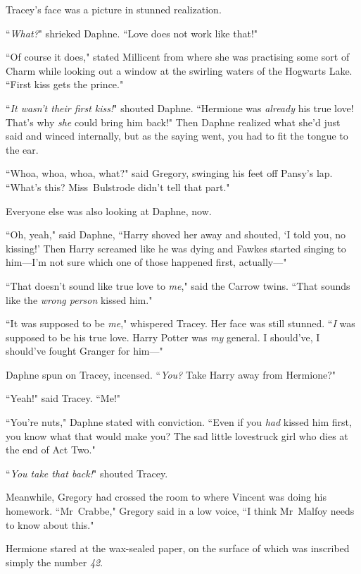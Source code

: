 Tracey's face was a picture in stunned realization.

``\emph{What?}" shrieked Daphne. ``Love does not work like that!"

``Of course it does," stated Millicent from where she was practising some sort of Charm while looking out a window at the swirling waters of the Hogwarts Lake. ``First kiss gets the prince."

``\emph{It wasn't their first kiss!}" shouted Daphne. ``Hermione was \emph{already} his true love! That's why \emph{she} could bring him back!" Then Daphne realized what she'd just said and winced internally, but as the saying went, you had to fit the tongue to the ear.

``Whoa, whoa, whoa, what?" said Gregory, swinging his feet off Pansy's lap. ``What's this? Miss~Bulstrode didn't tell that part."

Everyone else was also looking at Daphne, now.

``Oh, yeah," said Daphne, ``Harry shoved her away and shouted, `I told you, no kissing!' Then Harry screamed like he was dying and Fawkes started singing to him—I'm not sure which one of those happened first, actually—"

``That doesn't sound like true love to \emph{me}," said the Carrow twins. ``That sounds like the \emph{wrong person} kissed him."

``It was supposed to be \emph{me}," whispered Tracey. Her face was still stunned. ``\emph{I} was supposed to be his true love. Harry Potter was \emph{my} general. I should've, I should've fought Granger for him—"

Daphne spun on Tracey, incensed. ``\emph{You?} Take Harry away from Hermione?"

``Yeah!" said Tracey. ``Me!"

``You're nuts," Daphne stated with conviction. ``Even if you \emph{had} kissed him first, you know what that would make you? The sad little lovestruck girl who dies at the end of Act Two."

``\emph{You take that back!}" shouted Tracey.

Meanwhile, Gregory had crossed the room to where Vincent was doing his homework. ``Mr~Crabbe," Gregory said in a low voice, ``I think Mr~Malfoy needs to know about this."


Hermione stared at the wax-sealed paper, on the surface of which was inscribed simply the number \emph{42}.

